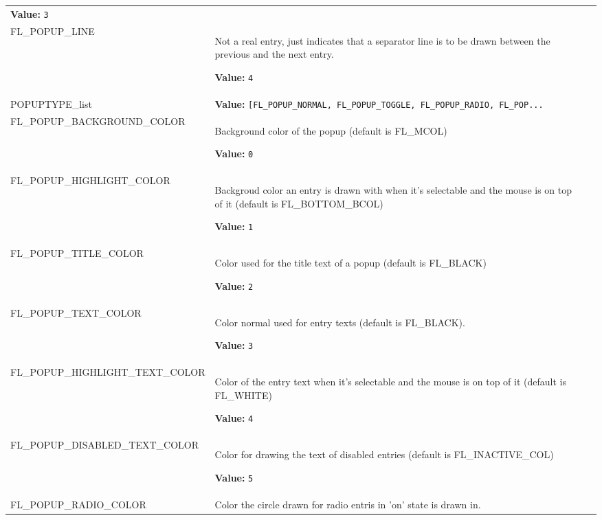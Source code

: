 \begin{longtable}{|p{\varnamewidth}|p{\vardescrwidth}|l}
\textbf{Value:} 
{\tt 3}&\\
\cline{1-2}
\raggedright F\-L\-\_\-P\-O\-P\-U\-P\-\_\-L\-I\-N\-E\- & \raggedright Not a real entry, just indicates that a separator line is to be drawn
between the previous and the next entry.

\textbf{Value:} 
{\tt 4}&\\
\cline{1-2}
\raggedright P\-O\-P\-U\-P\-T\-Y\-P\-E\-\_\-l\-i\-s\-t\- & \raggedright \textbf{Value:} 
{\tt [FL\_POPUP\_NORMAL, FL\_POPUP\_TOGGLE, FL\_POPUP\_RADIO, FL\_POP\texttt{...}}&\\
\cline{1-2}
\raggedright F\-L\-\_\-P\-O\-P\-U\-P\-\_\-B\-A\-C\-K\-G\-R\-O\-U\-N\-D\-\_\-C\-O\-L\-O\-R\- & \raggedright Background color of the popup (default is FL\_MCOL)

\textbf{Value:} 
{\tt 0}&\\
\cline{1-2}
\raggedright F\-L\-\_\-P\-O\-P\-U\-P\-\_\-H\-I\-G\-H\-L\-I\-G\-H\-T\-\_\-C\-O\-L\-O\-R\- & \raggedright Backgroud color an entry is drawn with when it's selectable and the
mouse is on top of it (default is FL\_BOTTOM\_BCOL)

\textbf{Value:} 
{\tt 1}&\\
\cline{1-2}
\raggedright F\-L\-\_\-P\-O\-P\-U\-P\-\_\-T\-I\-T\-L\-E\-\_\-C\-O\-L\-O\-R\- & \raggedright Color used for the title text of a popup (default is FL\_BLACK)

\textbf{Value:} 
{\tt 2}&\\
\cline{1-2}
\raggedright F\-L\-\_\-P\-O\-P\-U\-P\-\_\-T\-E\-X\-T\-\_\-C\-O\-L\-O\-R\- & \raggedright Color normal used for entry texts (default is FL\_BLACK).

\textbf{Value:} 
{\tt 3}&\\
\cline{1-2}
\raggedright F\-L\-\_\-P\-O\-P\-U\-P\-\_\-H\-I\-G\-H\-L\-I\-G\-H\-T\-\_\-T\-E\-X\-T\-\_\-C\-O\-L\-O\-R\- & \raggedright Color of the entry text when it's selectable and the mouse is on
top of it (default is FL\_WHITE)

\textbf{Value:} 
{\tt 4}&\\
\cline{1-2}
\raggedright F\-L\-\_\-P\-O\-P\-U\-P\-\_\-D\-I\-S\-A\-B\-L\-E\-D\-\_\-T\-E\-X\-T\-\_\-C\-O\-L\-O\-R\- & \raggedright Color for drawing the text of disabled entries (default is
FL\_INACTIVE\_COL)

\textbf{Value:} 
{\tt 5}&\\
\cline{1-2}
\raggedright F\-L\-\_\-P\-O\-P\-U\-P\-\_\-R\-A\-D\-I\-O\-\_\-C\-O\-L\-O\-R\- & \raggedright Color the circle drawn for radio entris in 'on' state is drawn in.


\end{longtable}
